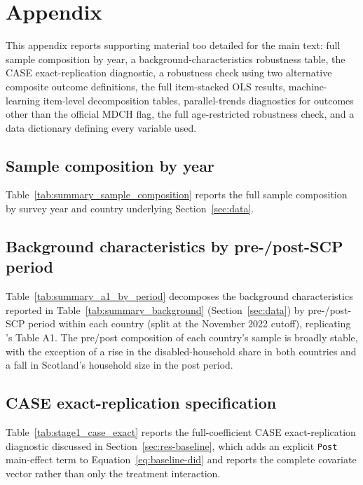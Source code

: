 \appendix
\section{Appendix}
\label{sec:appendix}

This appendix reports supporting material too detailed for the main text: full sample composition by year, a background-characteristics robustness table, the CASE exact-replication diagnostic, a robustness check using two alternative composite outcome definitions, the full item-stacked OLS results, machine-learning item-level decomposition tables, parallel-trends diagnostics for outcomes other than the official MDCH flag, the full age-restricted robustness check, and a data dictionary defining every variable used.

\subsection{Sample composition by year}
\label{sec:appendix-sample-composition}

Table~\ref{tab:summary_sample_composition} reports the full sample composition by survey year and country underlying Section~\ref{sec:data}.



\subsection{Background characteristics by pre-/post-SCP period}
\label{sec:appendix-a1-period}

Table~\ref{tab:summary_a1_by_period} decomposes the background characteristics reported in Table~\ref{tab:summary_background} (Section~\ref{sec:data}) by pre-/post-SCP period within each country (split at the November 2022 cutoff), replicating \citet{andersen2025}'s Table A1. The pre/post composition of each country's sample is broadly stable, with the exception of a rise in the disabled-household share in both countries and a fall in Scotland's household size in the post period.



\subsection{CASE exact-replication specification}
\label{sec:appendix-case-exact}

Table~\ref{tab:stage1_case_exact} reports the full-coefficient CASE exact-replication diagnostic discussed in Section~\ref{sec:res-baseline}, which adds an explicit \texttt{Post} main-effect term to Equation~\ref{eq:baseline-did} and reports the complete covariate vector rather than only the treatment interaction.


